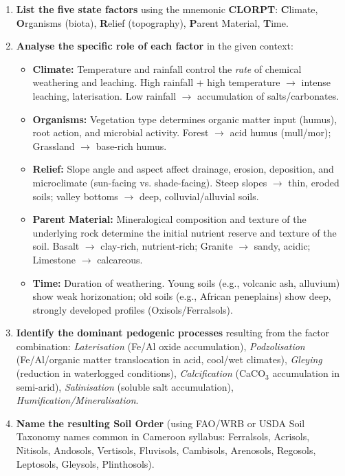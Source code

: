 \documentclass[11pt]{article}
\begin{document}
\begin{methode}
\begin{enumerate}
\item \textbf{List the five state factors} using the mnemonic \textbf{CLORPT}: \textbf{C}limate, \textbf{O}rganisms (biota), \textbf{R}elief (topography), \textbf{P}arent Material, \textbf{T}ime.
\item \textbf{Analyse the specific role of each factor} in the given context:
      \begin{itemize}
      \item \textbf{Climate:} Temperature and rainfall control the \emph{rate} of chemical weathering and leaching. High rainfall + high temperature $\rightarrow$ intense leaching, laterisation. Low rainfall $\rightarrow$ accumulation of salts/carbonates.
      \item \textbf{Organisms:} Vegetation type determines organic matter input (humus), root action, and microbial activity. Forest $\rightarrow$ acid humus (mull/mor); Grassland $\rightarrow$ base-rich humus.
      \item \textbf{Relief:} Slope angle and aspect affect drainage, erosion, deposition, and microclimate (sun-facing vs. shade-facing). Steep slopes $\rightarrow$ thin, eroded soils; valley bottoms $\rightarrow$ deep, colluvial/alluvial soils.
      \item \textbf{Parent Material:} Mineralogical composition and texture of the underlying rock determine the initial nutrient reserve and texture of the soil. Basalt $\rightarrow$ clay-rich, nutrient-rich; Granite $\rightarrow$ sandy, acidic; Limestone $\rightarrow$ calcareous.
      \item \textbf{Time:} Duration of weathering. Young soils (e.g., volcanic ash, alluvium) show weak horizonation; old soils (e.g., African peneplains) show deep, strongly developed profiles (Oxisols/Ferralsols).
      \end{itemize}
\item \textbf{Identify the dominant pedogenic processes} resulting from the factor combination: \emph{Laterisation} (Fe/Al oxide accumulation), \emph{Podzolisation} (Fe/Al/organic matter translocation in acid, cool/wet climates), \emph{Gleying} (reduction in waterlogged conditions), \emph{Calcification} (CaCO$_3$ accumulation in semi-arid), \emph{Salinisation} (soluble salt accumulation), \emph{Humification/Mineralisation}.
\item \textbf{Name the resulting Soil Order} (using FAO/WRB or USDA Soil Taxonomy names common in Cameroon syllabus: Ferralsols, Acrisols, Nitisols, Andosols, Vertisols, Fluvisols, Cambisols, Arenosols, Regosols, Leptosols, Gleysols, Plinthosols).
\end{enumerate}
\end{methode}
\end{document}
